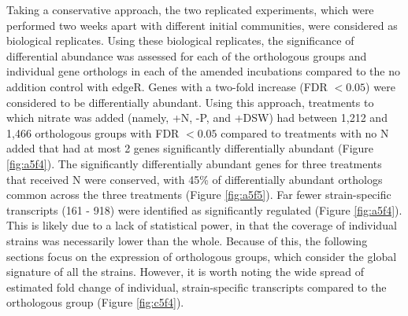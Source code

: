 Taking a conservative approach, the two replicated experiments, which were performed two weeks apart with different initial communities, were considered as biological replicates. Using these biological replicates, the significance of differential abundance was assessed for each of the orthologous groups and individual gene orthologs in each of the amended incubations compared to the no addition control with edgeR. Genes with a two-fold increase (FDR $< 0.05$) were considered to be differentially abundant. Using this approach, treatments to which nitrate was added (namely, +N, -P, and +DSW) had between 1,212 and 1,466 orthologous groups with FDR $< 0.05$ compared to treatments with no N added that had at most 2 genes significantly differentially abundant (Figure \ref{fig:a5f4}). The significantly differentially abundant genes for three treatments that received N were conserved, with 45\% of differentially abundant orthologs common across the three treatments (Figure \ref{fig:a5f5}). Far fewer strain-specific transcripts (161 - 918) were identified as significantly regulated (Figure \ref{fig:a5f4}). This is likely due to a lack of statistical power, in that the coverage of individual strains was necessarily lower than the whole. Because of this, the following sections focus on the expression of orthologous groups, which consider the global signature of all the strains. However, it is worth noting the wide spread of estimated fold change of individual, strain-specific transcripts compared to the orthologous group (Figure \ref{fig:c5f4}). \par

